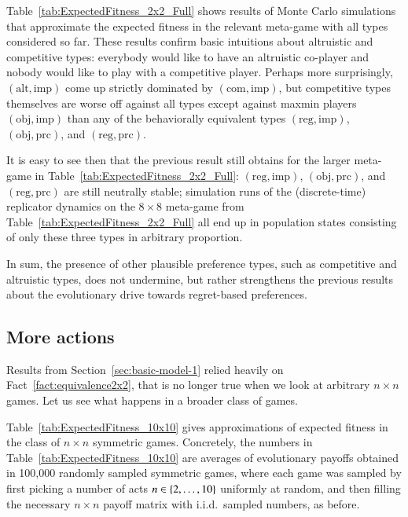 \documentclass[fleqn,reqno,11pt]{article}
\newcommand{\myalert}[1]{\textcolor{red}{#1}}
\begin{document}
Table~\ref{tab:ExpectedFitness_2x2_Full} shows results of Monte Carlo simulations that
approximate the expected fitness in the relevant meta-game with all types considered so
far. These results confirm basic intuitions about altruistic and competitive types: everybody would like to have an altruistic co-player and nobody
would like to play with a competitive player. Perhaps more surprisingly, $(\text{alt}, \text{imp})$
come up strictly dominated by $(\text{com}, \text{imp})$, but competitive types themselves are worse off
against all types except against maxmin players $(\text{obj}, \text{imp})$ than any of
the behaviorally equivalent types $(\text{reg}, \text{imp})$, $(\text{obj}, \text{prc})$, and
$(\text{reg}, \text{prc})$.
\iffalse This is a noteworthy results in the light of the fact
that evolving altruistic preferences have been shown to support cooperative behavior in a
single stage game \myalert{[CITE]}. In contrast, averaging over payoffs in multiple stage
games, like we do here, makes altruistic preferences prime victims of evolutionary eradication.
\fi
It is easy to see then that the previous result still obtains for the larger meta-game in
Table~\ref{tab:ExpectedFitness_2x2_Full}: $(\text{reg}, \text{imp})$,
$(\text{obj}, \text{prc})$, and $(\text{reg}, \text{prc})$ are still neutrally stable;
simulation runs of the (discrete-time) replicator dynamics on the $8 \times 8$ meta-game from
Table~\ref{tab:ExpectedFitness_2x2_Full} all end up in population states consisting of only these
three types in arbitrary proportion.

In sum, the presence of other plausible preference types, such as competitive and altruistic
types, does not undermine, but rather strengthens the previous results about the evolutionary
drive towards regret-based preferences.


                                   
\subsection{More actions}
\label{sec:n-times-n}

Results from Section~\ref{sec:basic-model-1} relied heavily on Fact~\ref{fact:equivalence2x2}, that
is no longer true when we look at arbitrary $n \times n$ games. Let us see what
happens in a broader class of games.

Table~\ref{tab:ExpectedFitness_10x10} gives approximations of expected fitness in the class of
$n \times n$ symmetric games. Concretely,
the numbers in Table~\ref{tab:ExpectedFitness_10x10} are averages of evolutionary payoffs obtained in
100,000 randomly sampled symmetric games, where each game was sampled by first picking a number of acts
$n \in \left\{2, \dots, 10\right\}$ uniformly at random, and then filling the necessary $n \times n$
payoff matrix with i.i.d.~sampled numbers, as before.
\end{document}

